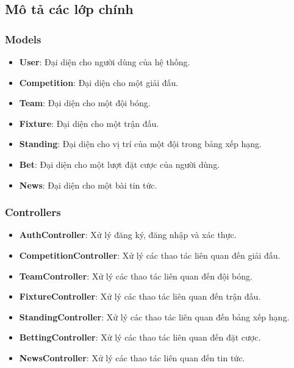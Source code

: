 \documentclass[a4paper,12pt]{report}
\begin{document}
\subsection{Mô tả các lớp chính}

\subsubsection{Models}
\begin{itemize}
    \item \textbf{User}: Đại diện cho người dùng của hệ thống.
    \item \textbf{Competition}: Đại diện cho một giải đấu.
    \item \textbf{Team}: Đại diện cho một đội bóng.
    \item \textbf{Fixture}: Đại diện cho một trận đấu.
    \item \textbf{Standing}: Đại diện cho vị trí của một đội trong bảng xếp hạng.
    \item \textbf{Bet}: Đại diện cho một lượt đặt cược của người dùng.
    \item \textbf{News}: Đại diện cho một bài tin tức.
\end{itemize}

\subsubsection{Controllers}
\begin{itemize}
    \item \textbf{AuthController}: Xử lý đăng ký, đăng nhập và xác thực.
    \item \textbf{CompetitionController}: Xử lý các thao tác liên quan đến giải đấu.
    \item \textbf{TeamController}: Xử lý các thao tác liên quan đến đội bóng.
    \item \textbf{FixtureController}: Xử lý các thao tác liên quan đến trận đấu.
    \item \textbf{StandingController}: Xử lý các thao tác liên quan đến bảng xếp hạng.
    \item \textbf{BettingController}: Xử lý các thao tác liên quan đến đặt cược.
    \item \textbf{NewsController}: Xử lý các thao tác liên quan đến tin tức.
\end{itemize}
\end{document}
